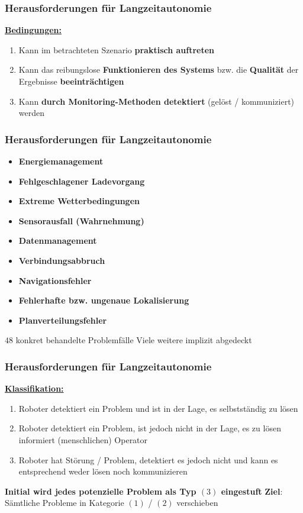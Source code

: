 \documentclass{beamer}
\begin{document}
\begin{frame}
  \frametitle{Herausforderungen für Langzeitautonomie}
  \textbf{\underline{Bedingungen:}}
  \begin{enumerate}
    \item Kann im betrachteten Szenario \textbf{praktisch auftreten}
    \item Kann das reibungslose \textbf{Funktionieren des Systems} bzw. die \textbf{Qualität} der Ergebnisse \textbf{beeinträchtigen}
    \item Kann \textbf{durch Monitoring-Methoden detektiert} (gelöst / kommuniziert) werden
  \end{enumerate}
\end{frame}

\begin{frame}
  \frametitle{Herausforderungen für Langzeitautonomie}
  \begin{itemize}
    \item \textbf{Energiemanagement}
    \item \textbf{Fehlgeschlagener Ladevorgang}
    \item \textbf{Extreme Wetterbedingungen}
    \item \textbf{Sensorausfall (Wahrnehmung)}
    \item \textbf{Datenmanagement}
    \item \textbf{Verbindungsabbruch}
    \item \textbf{Navigationsfehler}
    \item \textbf{Fehlerhafte bzw. ungenaue Lokalisierung}
    \item \textbf{Planverteilungsfehler}
  \end{itemize}
  \textrightarrow \thinspace $48$ konkret behandelte Problemfälle\newline
  \textrightarrow \thinspace Viele weitere implizit abgedeckt
\end{frame}

\begin{frame}
  \frametitle{Herausforderungen für Langzeitautonomie}
  \textbf{\underline{Klassifikation:}}
  \begin{enumerate}
    \item Roboter detektiert ein Problem und ist in der Lage, es selbstständig zu lösen
    \item Roboter detektiert ein Problem, ist jedoch nicht in der Lage, es zu lösen \textrightarrow \thinspace informiert (menschlichen) Operator
    \item Roboter hat Störung / Problem, detektiert es jedoch nicht und kann es entsprechend weder lösen noch kommunizieren
  \end{enumerate}
  \textrightarrow \thinspace \textbf{Initial wird jedes potenzielle Problem als Typ $(3)$ eingestuft}\newline
  \textbf{Ziel}: Sämtliche Probleme in Kategorie $(1)$ / $(2)$ verschieben
\end{frame}
\end{document}
